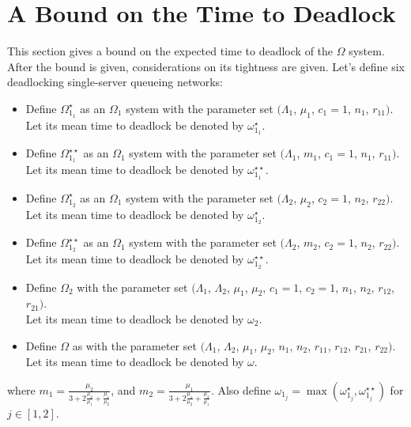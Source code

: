 \documentclass{article}
\numberwithin{equation}{section}
\begin{document}
\section{A Bound on the Time to Deadlock}\label{sec:bound}

This section gives a bound on the expected time to deadlock of the $\Omega$
system.
After the bound is given, considerations on its tightness are given.
Let's define six deadlocking single-server queueing networks:

\begin{itemize}
  \item Define $\Omega_{1_1}^{\star}$ as an $\Omega_1$ system with the
  parameter set $(\Lambda_1$, $\mu_1$, $c_1=1$, $n_1$, $r_{11})$.\\
  Let its mean time to deadlock be denoted by $\omega_{1_1}^{\star}$.
  \item Define $\Omega_{1_1}^{\star\star}$ as an $\Omega_1$ system with the
  parameter set $(\Lambda_1$, $m_1$, $c_1=1$, $n_1$, $r_{11})$.\\
  Let its mean time to deadlock be denoted by $\omega_{1_1}^{\star\star}$.
  \item Define $\Omega_{1_2}^{\star}$ as an $\Omega_1$ system with the
  parameter set $(\Lambda_2$, $\mu_2$, $c_2=1$, $n_2$, $r_{22})$.\\
  Let its mean time to deadlock be denoted by $\omega_{1_2}^{\star}$.
  \item Define $\Omega_{1_2}^{\star\star}$ as an $\Omega_1$ system with the
  parameter set $(\Lambda_2$, $m_2$, $c_2=1$, $n_2$, $r_{22})$.\\
  Let its mean time to deadlock be denoted by $\omega_{1_2}^{\star\star}$.
  \item Define $\Omega_2$ with the parameter set $(\Lambda_1$, $\Lambda_2$,
  $\mu_1$, $\mu_2$, $c_1=1$, $c_2=1$, $n_1$, $n_2$, $r_{12}$, $r_{21})$.\\
  Let its mean time to deadlock be denoted by $\omega_2$.
  \item Define $\Omega$ as with the parameter set $(\Lambda_1$, $\Lambda_2$,
  $\mu_1$, $\mu_2$, $n_1$, $n_2$, $r_{11}$, $r_{12}$, $r_{21}$, $r_{22})$.\\
  Let its mean time to deadlock be denoted by $\omega$.
\end{itemize}

where $m_1 = \frac{\mu_2}{3 + 2\frac{\mu_2}{\mu_1} + \frac{\mu_1}{\mu_2}}$,
and $m_2 = \frac{\mu_1}{3 + 2\frac{\mu_1}{\mu_2} + \frac{\mu_2}{\mu_1}}$.
Also define $\omega_{1_j} = \max(\omega_{1_j}^{\star}, \omega_{1_j}^{\star\star})$
for $j \in [1, 2]$.
\end{document}
